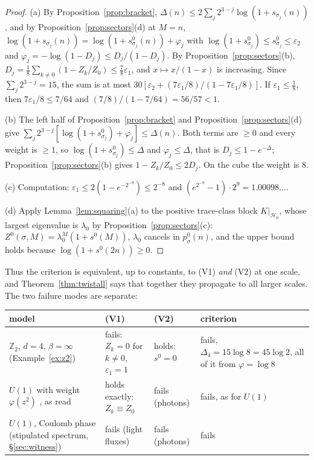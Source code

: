 \documentclass[11pt,a4paper]{article}
\theoremstyle{plain}
\theoremstyle{definition}
\theoremstyle{remark}
\numberwithin{equation}{section}
\newcommand{\Z}{\mathbb{Z}}
\begin{document}
\begin{proof}
(a) By Proposition~\ref{prop:bracket}, $\Delta(n)\le2\sum_j2^{3-j}\log(1+s_{\sigma_j}(n))$, and by Proposition~\ref{prop:sectors}(d) at $M=n$, $\log(1+s_{\sigma_j}(n))=\log(1+s^0_{\sigma_j}(n))+\varphi_j$ with $\log(1+s^0_{\sigma_j})\le s^0_{\sigma_j}\le\varepsilon_2$ and $\varphi_j=-\log(1-D_j)\le D_j/(1-D_j)$. By Proposition~\ref{prop:sectors}(b), $D_j=\frac18\sum_{k\ne0}(1-Z_k/Z_0)\le\frac78\varepsilon_1$, and $x\mapsto x/(1-x)$ is increasing. Since $\sum_j2^{3-j}=15$, the sum is at most $30[\varepsilon_2+(7\varepsilon_1/8)/(1-7\varepsilon_1/8)]$. If $\varepsilon_1\le\frac18$, then $7\varepsilon_1/8\le7/64$ and $(7/8)/(1-7/64)=56/57<1$.

(b) The left half of Proposition~\ref{prop:bracket} and Proposition~\ref{prop:sectors}(d) give $\sum_j2^{3-j}[\log(1+s^0_{\sigma_j})+\varphi_j]\le\Delta(n)$. Both terms are $\ge0$ and every weight is $\ge1$, so $\log(1+s^0_{\sigma_j})\le\Delta$ and $\varphi_j\le\Delta$, that is $D_j\le1-e^{-\Delta}$; Proposition~\ref{prop:sectors}(b) gives $1-Z_k/Z_0\le2D_j$. On the cube the weight is $8$.

(c) Computation: $\varepsilon_1\le2(1-e^{-2^{-9}})\le2^{-8}$ and $(e^{2^{-9}}-1)\cdot2^9=1.00098\ldots$.

(d) Apply Lemma~\ref{lem:squaring}(a) to the positive trace-class block $K|_{\mathcal H_0}$, whose largest eigenvalue is $\lambda_0$ by Proposition~\ref{prop:sectors}(c): $Z^0(\sigma,M)=\lambda_0^M(1+s^0(M))$, $\lambda_0$ cancels in $p^0_\sigma(n)$, and the upper bound holds because $\log(1+s^0(2n))\ge0$.
\end{proof}
Thus the criterion is equivalent, up to constants, to (V1) \emph{and} (V2) at one scale, and Theorem~\ref{thm:twistall} says that together they propagate to all larger scales. The two failure modes are separate:
\begin{center}\footnotesize
\begin{tabular}{@{}>{\raggedright\arraybackslash}p{}>{\raggedright\arraybackslash}p{}>{\raggedright\arraybackslash}p{}>{\raggedright\arraybackslash}p{}@{}}
\toprule
model & (V1) & (V2) & criterion\\
\midrule
$\Z_2$, $d=4$, $\beta=\infty$ (Example~\ref{ex:z2}) & fails: $Z_k=0$ for $k\ne0$, $\varepsilon_1=1$ & holds: $s^0=0$ & fails, $\Delta_4=15\log8=45\log2$, all of it from $\varphi=\log8$\\
$U(1)$ with weight $\varphi(z^2)$ \cite[Prop.~11.29]{BB26v5}, as read & holds exactly: $Z_k\equiv Z_0$ & fails (photons) & fails, as for $U(1)$\\
$U(1)$, Coulomb phase (stipulated spectrum, \S\ref{sec:witness}) & fails (light fluxes) & fails (photons) & fails\\
\bottomrule
\end{tabular}
\end{center}
\end{document}
